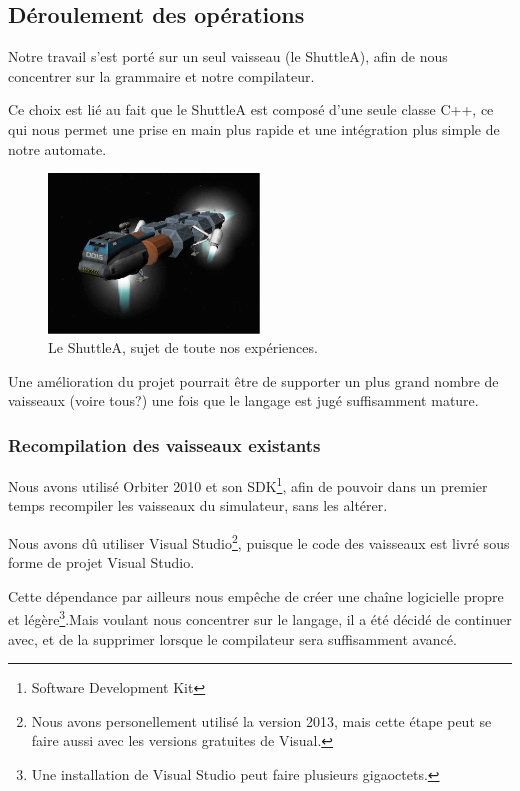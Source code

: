 \documentclass[a4paper,11pt]{article}
\begin{document}
    \subsection{Déroulement des opérations}
        Notre travail s'est porté sur un seul vaisseau (le ShuttleA), afin de nous concentrer sur la grammaire et notre compilateur. 
        
        Ce choix est lié au fait que le ShuttleA est composé d'une seule classe C++, ce qui nous permet une prise en main plus rapide et une intégration plus simple de notre automate. 
        
        \begin{figure}[!h]
            \begin{center}
                \includegraphics[width=0.5\textwidth]{img/shuttleA.png}
                \caption{Le ShuttleA, sujet de toute nos expériences.}
            \end{center}
        \end{figure}
        
        Une amélioration du projet pourrait être de supporter un plus grand nombre de vaisseaux (voire tous?) une fois que le langage est jugé suffisamment mature.



    \subsubsection{Recompilation des vaisseaux existants}
        Nous avons utilisé Orbiter 2010 et son SDK\footnote{Software Development Kit}, afin de pouvoir dans un premier temps recompiler les vaisseaux du simulateur, sans les altérer.

        Nous avons dû utiliser Visual Studio\footnote{Nous avons personellement utilisé la version 2013, mais cette étape peut se faire aussi avec les versions gratuites de Visual.}, puisque le code des vaisseaux est livré sous forme de projet Visual Studio. 
        
        Cette dépendance par ailleurs nous empêche de créer une chaîne logicielle propre et légère\footnote{Une installation de Visual Studio peut faire plusieurs gigaoctets.}.Mais voulant nous concentrer sur le langage, il a été décidé de continuer avec, et de la supprimer lorsque le compilateur sera suffisamment avancé.
\end{document}
